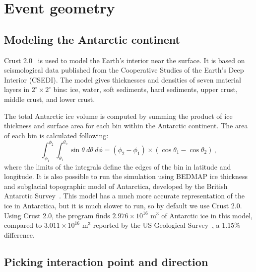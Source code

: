 \section{Event geometry}
\label{sec:eventGeometry}

\subsection{Modeling the Antarctic continent}
Crust 2.0~\cite{crust2} is used to model the Earth's interior near the 
surface.  It is based on seismological data published from the Cooperative Studies of the Earth's Deep Interior (CSEDI).
The model gives thicknesses and densities of seven material
layers in $2^{\circ} \times 2^{\circ}$ bins:  ice, water, soft sediments, hard sediments, upper crust,
middle crust, and lower crust.  

The total Antarctic ice volume is computed by summing the product of ice
thickness and surface area for each bin within the Antarctic continent.
The area of each bin is calculated following:
\begin{equation}
\int_{\phi_1}^{\phi_2}\int_{\theta_1}^{\theta_2}\sin{\theta}~d\theta~d\phi=\left(\phi_2-\phi_1\right)\times\left(\cos{\theta_1}-\cos{\theta_2}\right) \, ,
\end{equation}
\noindent where the limits of the integrals define the edges of the bin in
latitude and longitude.
It is also possible to run the simulation using BEDMAP ice thickness
and subglacial topographic model of Antarctica, developed by the
British Antarctic Survey~\cite{bedmap}.
This model has a much more accurate representation of the ice in
Antarctica, but it is much slower to run, so by default we use
Crust 2.0.
Using Crust 2.0, the \icemc program finds $2.976 \times 10^{16}$ m$^3$ of Antarctic ice in this model, compared to $3.011 \times 10^{16}$ m$^3$ reported by the US Geological Survey~\cite{usgs}, a 1.15\% difference.

\subsection{Picking interaction point and direction}
\label{sec:pickneutrino}

